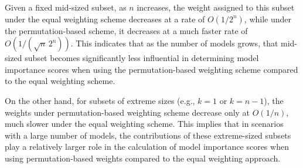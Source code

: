 \documentclass[
  article,
  shortnames,
  notitle]{jss}
\begin{document}
Given a fixed mid-sized subset, as \(n\) increases, the weight assigned
to this subset under the equal weighting scheme decreases at a rate of
\(O({1}/{2^n})\), while under the permutation-based scheme, it decreases
at a much faster rate of \(O({1}/({\sqrt{n}\,2^n}))\). This indicates
that as the number of models grows, that mid-sized subset becomes
significantly less influential in determining model importance scores
when using the permutation-based weighting scheme compared to the equal
weighting scheme.

On the other hand, for subsets of extreme sizes (e.g., \(k=1\) or
\(k=n-1\)), the weights under permutation-based weighting scheme
decrease only at \(O({1}/{n})\), much slower under the equal weighting
scheme. This implies that in scenarios with a large number of models,
the contributions of these extreme-sized subsets play a relatively
larger role in the calculation of model importance scores when using
permutation-based weights compared to the equal weighting approach.


\renewcommand\refname{References}

\end{document}
